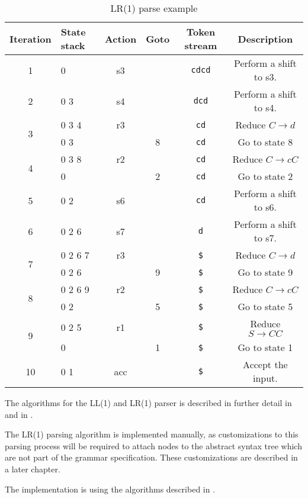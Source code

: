 \begin{table}
\centering
\begin{tabular}{c|l|c|c|c|c}
Iteration & State stack & Action & Goto & Token stream & Description\\
\hline 
1 & 0 & s3 & & \verb|cdcd| & Perform a shift to s3.\\
\hline 
2 & 0 3 & s4 & & \verb|dcd| & Perform a shift to s4.\\
\hline 
\multirow{2}{*}{3} & 0 3 4 & r3 &  & \verb|cd| & Reduce $C \rightarrow d$\\
& 0 3 & & 8 & \verb|cd| & Go to state 8\\
\hline 
\multirow{2}{*}{4} & 0 3 8 & r2 & & \verb|cd| & Reduce $C \rightarrow c C$\\
& 0 &  & 2 & \verb|cd| & Go to state 2\\
\hline 
5 & 0 2 & s6 & & \verb|cd| & Perform a shift to s6.\\
\hline 
6 & 0 2 6 & s7 & & \verb|d| & Perform a shift to s7.\\
\hline 
\multirow{2}{*}{7} & 0 2 6 7 & r3 & & \verb|$| & Reduce $C \rightarrow d$\\
& 0 2 6 &  & 9 & \verb|$| & Go to state 9\\
\hline 
\multirow{2}{*}{8} & 0 2 6 9 & r2 & & \verb|$| & Reduce $C \rightarrow c C$\\
& 0 2 &  & 5 & \verb|$| & Go to state 5\\
\hline 
\multirow{2}{*}{9} & 0 2 5 & r1 & & \verb|$| & Reduce $S \rightarrow C C$\\
& 0 &  & 1 & \verb|$| & Go to state 1\\
\hline 
10 & 0 1 & acc & & \verb|$| & Accept the input.\\
\end{tabular}
\caption{LR(1) parse example}
\label{table:lr1_parse_example}
\end{table}

The algorithms for the LL(1) and LR(1) parser is described in further detail in \cite[pages 45-67]{Appel2002-kleene} and in \cite[chapter 4 - Syntax analysis]{AhoLSU2006}.

The LR(1) parsing algorithm is implemented manually, as customizations to this parsing process will be required to attach nodes to the abstract syntax tree
which are not part of the grammar specification. These customizations are described in a later chapter.

The implementation is using the algorithms described in \cite[Handouts 10, 11]{stanford_course}.